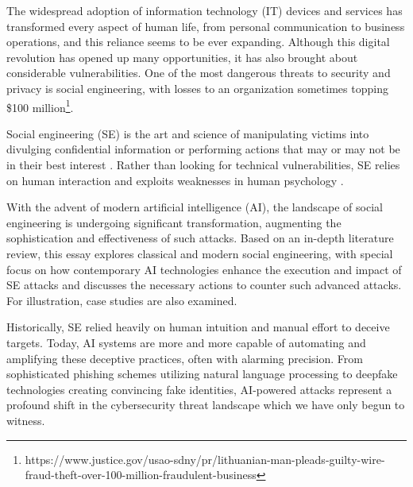 \begin{comment}
    - Johdannon pituus määräytyy suhteessa koko kirjoitelman pituuteen. Parisivuinen kirjoitus ei erikseen otsikoitua johdantoa kaipaa, sillä se itsessään on laajennettu tiivistelmä. Kymmensivuisen kirjoituksen johdanto voi olla vaikkapa sivun tai puolentoista mittainen. Pro gradu -tutkielman 50-70-sivuiseen kokonaisuuteen tuntuu 2-4-sivuinen johdanto kohtuulliselta.

    - Johdanto kertoo siis lyhyessä, yleistajuisessa muodossa koko kirjoitelman kysymyksenasettelun, juonen sekä tulokset ja johtopäätelmät. Tämän luettuaan lukija voi päätellä, haluaako syventyä asiaan tarkemmin lukemalla koko kirjoituksen.

\end{comment}

The widespread adoption of information technology (IT) devices and services has transformed every aspect of human life, from personal communication to business operations, and this reliance seems to be ever expanding. Although this digital revolution has opened up many opportunities, it has also brought about considerable vulnerabilities. One of the most dangerous threats to security and privacy is social engineering, with losses to an organization sometimes topping \$100 million\footnote{https://www.justice.gov/usao-sdny/pr/lithuanian-man-pleads-guilty-wire-fraud-theft-over-100-million-fraudulent-business}.

Social engineering (SE) is the art and science of manipulating victims into divulging confidential information or performing actions that may or may not be in their best interest \citep{hadnagySocialEngineering2018}. Rather than looking for technical vulnerabilities, SE relies on human interaction and exploits weaknesses in human psychology \citep{wangDefiningSocialEngineering2020}.

With the advent of modern artificial intelligence (AI), the landscape of social engineering is undergoing significant transformation, augmenting the sophistication and effectiveness of such attacks. Based on an in-depth literature review, this essay explores classical and modern social engineering, with special focus on how contemporary AI technologies enhance the execution and impact of SE attacks and discusses the necessary actions to counter such advanced attacks. For illustration, case studies are also examined.

Historically, SE relied heavily on human intuition and manual effort to deceive targets. Today, AI systems are more and more capable of automating and amplifying these deceptive practices, often with alarming precision. From sophisticated phishing schemes utilizing natural language processing to deepfake technologies creating convincing fake identities, AI-powered attacks represent a profound shift in the cybersecurity threat landscape which we have only begun to witness.

